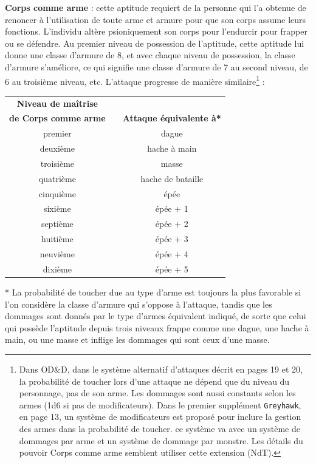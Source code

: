 \documentclass[11pt]{article}
\begin{document}
{\textbf{Corps comme arme} : cette aptitude requiert de la personne qui l'a obtenue de renoncer à l'utilisation de toute arme et armure pour que son corps assume leurs fonctions. L'individu altère psioniquement son corps pour l'endurcir pour frapper ou se défendre. Au premier niveau de possession de l'aptitude, cette aptitude lui donne une classe d'armure de 8, et avec chaque niveau de possession, la classe d'armure s'améliore, ce qui signifie une classe d'armure de 7 au second niveau, de 6 au troisième niveau, etc. L'attaque progresse de manière similaire\footnote{Dans OD\&D, dans le système alternatif d'attaques décrit en pages 19 et 20, la probabilité de toucher lors d'une attaque ne dépend que du niveau du personnage, pas de son arme. Les dommages sont aussi constants selon les armes (1d6 si pas de modificateurs). Dans le premier supplément \texttt{Greyhawk}, en page 13, un système de modificateurs est proposé pour inclure la gestion des armes dans la probabilité de toucher. ce système va avec un système de dommages par arme et un système de dommage par monstre. Les détails du pouvoir Corps comme arme semblent utiliser cette extension (NdT). } :

{\parindent2cm\begin{tabular}{cp{2.5cm}c}
\textbf{Niveau de maîtrise} && \\
\textbf{de Corps comme arme} && \textbf{Attaque équivalente à*} \\
premier && dague \\
deuxième && hache à main \\
troisième && masse \\
quatrième && hache de bataille \\
cinquième && épée \\
sixième && épée + 1 \\
septième && épée + 2 \\
huitième && épée + 3 \\
neuvième && épée + 4 \\
dixième && épée + 5 \\
\end{tabular}}

\bigskip

* La probabilité de toucher due au type d'arme est toujours la plus favorable si l'on considère la classe d'armure qui s'oppose à l'attaque, tandis que les dommages sont donnés par le type d'armes équivalent indiqué, de sorte que celui qui possède l'aptitude depuis trois niveaux frappe comme une dague, une hache à main, ou une masse et inflige les dommages qui sont ceux d'une masse.

}
\end{document}

